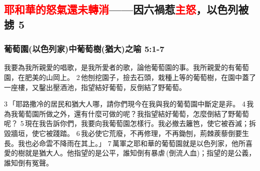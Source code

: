 
\subsection{\textcolor{red}{耶和華的怒氣還未轉消}——因六禍惹\textcolor{red}{主怒}，以色列被掳 5}
\subsubsection{葡萄園(以色列家)中葡萄樹(猶大)之喻 5:1-7}
我要為我所親愛的唱歌，是我所愛者的歌，論他葡萄園的事。我所親愛的有葡萄園，在肥美的山岡上。 2 他刨挖園子，撿去石頭，栽種上等的葡萄樹，在園中蓋了一座樓，又鑿出壓酒池，指望結好葡萄，反倒結了野葡萄。

3 「耶路撒冷的居民和猶大人哪，請你們現今在我與我的葡萄園中斷定是非。 4 我為我葡萄園所做之外，還有什麼可做的呢？我指望結好葡萄，怎麼倒結了野葡萄呢？ 5 現在我告訴你們，我要向我葡萄園怎樣行。我必撤去籬笆，使它被吞滅；拆毀牆垣，使它被踐踏。 6 我必使它荒廢，不再修理，不再鋤刨，荊棘蒺藜倒要生長。我也必命雲不降雨在其上。」 7 萬軍之耶和華的葡萄園就是以色列家，他所喜愛的樹就是猶大人。他指望的是公平，誰知倒有暴虐 (倒流人血)；指望的是公義，誰知倒有冤聲。


